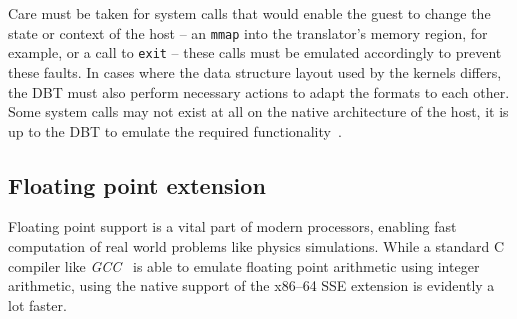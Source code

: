 Care must be taken for system calls that would enable the guest to change the state or context of the host -- an \texttt{mmap} into the translator's memory region, for example, or a call to \texttt{exit} -- these calls must be emulated accordingly to prevent these faults.
In cases where the data structure layout used by the kernels differs, the DBT must also perform necessary actions to adapt the formats to each other.
Some system calls may not exist at all on the native architecture of the host, it is up to the DBT to emulate the required functionality~\cite[S. 2f.]{bintrans}.

\subsection{Floating point extension}
\label{subsec:fp_extension}
Floating point support is a vital part of modern processors, enabling fast computation of real world problems like physics simulations.
While a standard C compiler like \textit{GCC}~\cite{gcc-web} is able to emulate floating point arithmetic using integer arithmetic, using the native support of the x86--64 SSE extension is evidently a lot faster.

